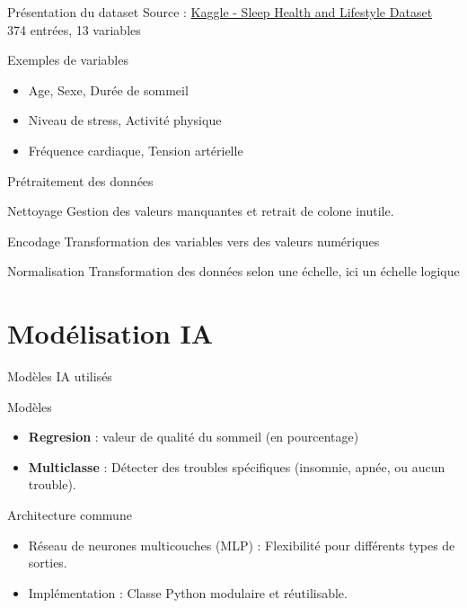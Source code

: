 \documentclass{beamer}
\begin{document}
\begin{frame}{Présentation du dataset}
    \centering
    \vspace{1cm}
    Source : \href{https://www.kaggle.com/datasets/uom190346a/sleep-health-and-lifestyle-dataset}{Kaggle - Sleep Health and Lifestyle Dataset}\\
    \vspace{0.5cm}
    374 entrées, 13 variables\\
    \vspace{0.5cm}
    \begin{block}{Exemples de variables}
        \begin{itemize}
          \item Age, Sexe, Durée de sommeil
          \item Niveau de stress, Activité physique
          \item Fréquence cardiaque, Tension artérielle
        \end{itemize}
    \end{block}
\end{frame}

\begin{frame}{Prétraitement des données}
  \begin{block}{Nettoyage}
       Gestion des valeurs manquantes et retrait de colone inutile.
  \end{block}
  \begin{block}{Encodage}
      Transformation des variables vers des valeurs numériques
  \end{block}
  \begin{block}{Normalisation}
      Transformation des données selon une échelle, ici un échelle logique
  \end{block}
\end{frame}

\section{Modélisation IA}

\begin{frame}{Modèles IA utilisés}
    \begin{block}{Modèles}
        \begin{itemize}
          \item \textbf{Regresion} : valeur de qualité du sommeil (en pourcentage)
          \item \textbf{Multiclasse} : Détecter des troubles spécifiques (insomnie, apnée, ou aucun trouble).
        \end{itemize}
    \end{block}
    \begin{block}{Architecture commune}
        \begin{itemize}
            \item Réseau de neurones multicouches (MLP) : Flexibilité pour différents types de sorties.
            \item Implémentation : Classe Python modulaire et réutilisable.
        \end{itemize}
    \end{block}
\end{frame}
\end{document}
